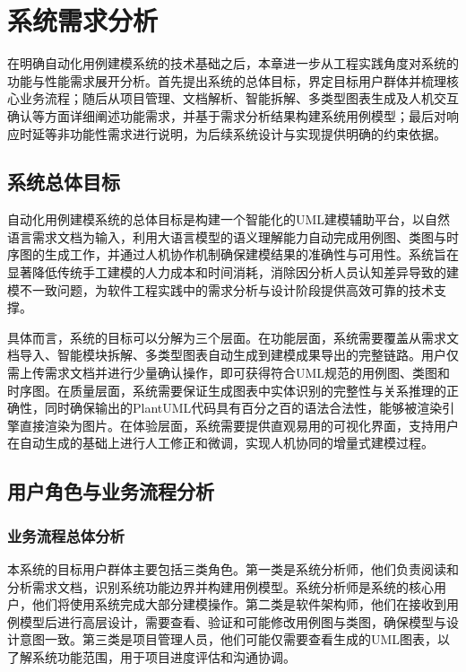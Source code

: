 \chapter{系统需求分析}
\vspace{7pt}

在明确自动化用例建模系统的技术基础之后，本章进一步从工程实践角度对系统的功能与性能需求展开分析。首先提出系统的总体目标，界定目标用户群体并梳理核心业务流程；随后从项目管理、文档解析、智能拆解、多类型图表生成及人机交互确认等方面详细阐述功能需求，并基于需求分析结果构建系统用例模型；最后对响应时延等非功能性需求进行说明，为后续系统设计与实现提供明确的约束依据。

\section{系统总体目标}

自动化用例建模系统的总体目标是构建一个智能化的UML建模辅助平台，以自然语言需求文档为输入，利用大语言模型的语义理解能力自动完成用例图、类图与时序图的生成工作，并通过人机协作机制确保建模结果的准确性与可用性。系统旨在显著降低传统手工建模的人力成本和时间消耗，消除因分析人员认知差异导致的建模不一致问题，为软件工程实践中的需求分析与设计阶段提供高效可靠的技术支撑。

具体而言，系统的目标可以分解为三个层面。在功能层面，系统需要覆盖从需求文档导入、智能模块拆解、多类型图表自动生成到建模成果导出的完整链路。用户仅需上传需求文档并进行少量确认操作，即可获得符合UML规范的用例图、类图和时序图。在质量层面，系统需要保证生成图表中实体识别的完整性与关系推理的正确性，同时确保输出的PlantUML代码具有百分之百的语法合法性，能够被渲染引擎直接渲染为图片。在体验层面，系统需要提供直观易用的可视化界面，支持用户在自动生成的基础上进行人工修正和微调，实现人机协同的增量式建模过程。

\section{用户角色与业务流程分析}

\subsection{业务流程总体分析}

本系统的目标用户群体主要包括三类角色。第一类是系统分析师，他们负责阅读和分析需求文档，识别系统功能边界并构建用例模型。系统分析师是系统的核心用户，他们将使用系统完成大部分建模操作。第二类是软件架构师，他们在接收到用例模型后进行高层设计，需要查看、验证和可能修改用例图与类图，确保模型与设计意图一致。第三类是项目管理人员，他们可能仅需要查看生成的UML图表，以了解系统功能范围，用于项目进度评估和沟通协调。

